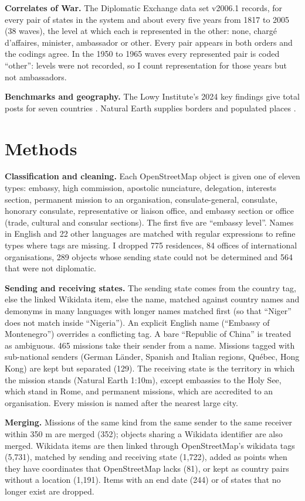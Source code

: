 \documentclass[11pt,a4paper]{article}
\begin{document}
\textbf{Correlates of War.} The Diplomatic Exchange data set v2006.1 \citep{bayer} records, for every pair of states in the system and about every five years from 1817 to 2005 (38 waves), the level at which each is represented in the other: none, charg\'e d'affaires, minister, ambassador or other. Every pair appears in both orders and the codings agree. In the 1950 to 1965 waves every represented pair is coded ``other'': levels were not recorded, so I count representation for those years but not ambassadors.

\textbf{Benchmarks and geography.} The Lowy Institute's 2024 key findings give total posts for seven countries \citep{lowy}. Natural Earth supplies borders and populated places \citep{naturalearth}.

\section{Methods}
\textbf{Classification and cleaning.} Each OpenStreetMap object is given one of eleven types: embassy, high commission, apostolic nunciature, delegation, interests section, permanent mission to an organisation, consulate-general, consulate, honorary consulate, representative or liaison office, and embassy section or office (trade, cultural and consular sections). The first five are ``embassy level''. Names in English and 22 other languages are matched with regular expressions to refine types where tags are missing. I dropped 775 residences, 84 offices of international organisations, 289 objects whose sending state could not be determined and 564 that were not diplomatic.

\textbf{Sending and receiving states.} The sending state comes from the country tag, else the linked Wikidata item, else the name, matched against country names and demonyms in many languages with longer names matched first (so that ``Niger'' does not match inside ``Nigeria''). An explicit English name (``Embassy of Montenegro'') overrides a conflicting tag. A bare ``Republic of China'' is treated as ambiguous. 465 missions take their sender from a name. Missions tagged with sub-national senders (German L\"ander, Spanish and Italian regions, Qu\'ebec, Hong Kong) are kept but separated (129). The receiving state is the territory in which the mission stands (Natural Earth 1:10m), except embassies to the Holy See, which stand in Rome, and permanent missions, which are accredited to an organisation. Every mission is named after the nearest large city.

\textbf{Merging.} Missions of the same kind from the same sender to the same receiver within 350 m are merged (352); objects sharing a Wikidata identifier are also merged. Wikidata items are then linked through OpenStreetMap's wikidata tags (5,731), matched by sending and receiving state (1,722), added as points when they have coordinates that OpenStreetMap lacks (81), or kept as country pairs without a location (1,191). Items with an end date (244) or of states that no longer exist are dropped.
\end{document}
